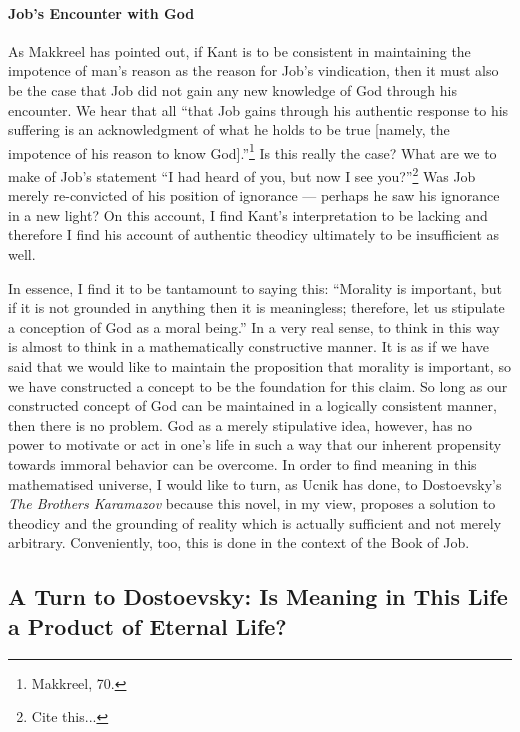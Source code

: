 \documentclass[12pt]{article}
\begin{document}
	\paragraph*{Job's Encounter with God} As Makkreel has pointed out, if Kant is to be consistent in maintaining the impotence of man's reason as the reason for Job's vindication, then it must also be the case that Job did not gain any new knowledge of God through his encounter. We hear that all ``that Job gains through his authentic response to his suffering is an acknowledgment of what he holds to be true [namely, the impotence of his reason to know God].''\footnote{Makkreel, 70.} Is this really the case? What are we to make of Job's statement ``I had heard of you, but now I see you?''\footnote{Cite this...} Was Job merely re-convicted of his position of ignorance --- perhaps he saw his ignorance in a new light? On this account, I find Kant's interpretation to be lacking and therefore I find his account of authentic theodicy ultimately to be insufficient as well. 
	
	In essence, I find it to be tantamount to saying this: ``Morality is important, but if it is not grounded in anything then it is meaningless; therefore, let us stipulate a conception of God as a moral being.'' In a very real sense, to think in this way is almost to think in a mathematically constructive manner. It is as if we have said that we would like to maintain the proposition that morality is important, so we have constructed a concept to be the foundation for this claim. So long as our constructed concept of God can be maintained in a logically consistent manner, then there is no problem. God as a merely stipulative idea, however, has no power to motivate or act in one's life in such a way that our inherent propensity towards immoral behavior can be overcome. In order to find meaning in this mathematised universe, I would like to turn, as Ucnik has done, to Dostoevsky's \emph{The Brothers Karamazov} because this novel, in my view, proposes a solution to theodicy and the grounding of reality which is actually sufficient and not merely arbitrary. Conveniently, too, this is done in the context of the Book of Job. 
	
	\subsection*{A Turn to Dostoevsky: Is Meaning in This Life a Product of Eternal Life?}
	
\end{document}
